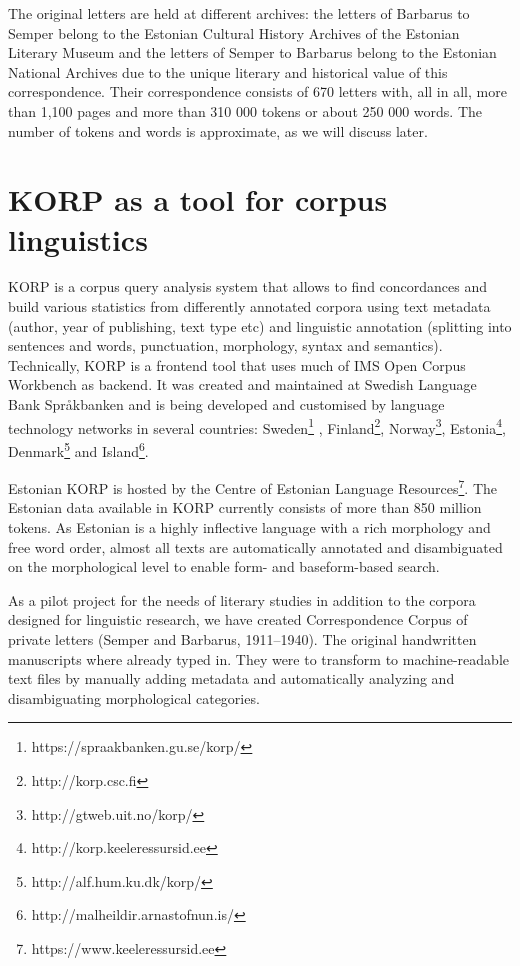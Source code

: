 \documentclass[runningheads]{llncs}
\begin{document}
The original letters are held at different archives: the letters of Barbarus to Semper belong to the Estonian Cultural History Archives of the Estonian Literary Museum and the letters of Semper to Barbarus belong to the Estonian National Archives due to the unique literary and historical value of this correspondence. Their correspondence consists of 670 letters with, all in all, more than 1,100 pages and more than 310 000 tokens or about 250 000 words.  The number of tokens and words is approximate, as we will discuss later. 


\section{KORP as a tool for corpus linguistics}

KORP is a corpus query analysis system that allows to find concordances and build various statistics from differently annotated corpora using text metadata (author, year of publishing, text type etc) and linguistic annotation (splitting into sentences and words, punctuation, morphology, syntax and semantics). Technically, KORP is a frontend tool that uses much of IMS Open Corpus Workbench \cite{Hardie:2012:1384-6655:380} as backend. It was created and maintained at Swedish Language Bank Spr{\aa}kbanken \cite{BORIN12.248} and is being developed and customised by language technology networks in several countries: Sweden\footnote{ https://spraakbanken.gu.se/korp/}
, Finland\footnote{http://korp.csc.fi}, Norway\footnote{http://gtweb.uit.no/korp/}, Estonia\footnote{http://korp.keeleressursid.ee}, Denmark\footnote{http://alf.hum.ku.dk/korp/} and Island\footnote{http://malheildir.arnastofnun.is/}. 

Estonian KORP is hosted by the Centre of Estonian Language Resources\footnote{https://www.keeleressursid.ee}. The Estonian data available in KORP currently consists of more than 850 million tokens. As Estonian is a highly inflective language with a rich morphology and free word order, almost all texts are automatically annotated and disambiguated on the morphological level to enable form- and baseform-based search.


As a pilot project for the needs of literary studies in addition to the corpora designed for linguistic research, we have created Correspondence Corpus of private letters (Semper and Barbarus, 1911--1940). The original handwritten manuscripts where already typed in. They were to transform to machine-readable text files by manually adding metadata and automatically analyzing and disambiguating morphological categories. 
\end{document}
